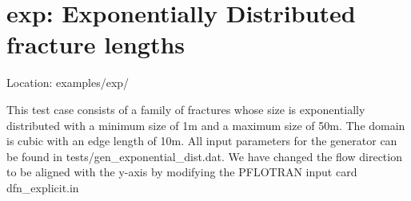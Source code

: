 \documentclass[letterpaper,10pt,english]{sphinxmanual}
\begin{document}
\begin{figure}[htbp]
\centering
\capstart

\noindent{}
\caption{}\label{\detokenize{examples:id4}}\end{figure}

\begin{figure}[htbp]
\centering
\capstart

\noindent{}
\caption{}\label{\detokenize{examples:id5}}\end{figure}

\begin{figure}[htbp]
\centering
\capstart

\noindent{}
\caption{}\label{\detokenize{examples:id6}}\end{figure}


\section{exp: Exponentially Distributed fracture lengths}
\label{\detokenize{examples:exp-exponentially-distributed-fracture-lengths}}
Location: examples/exp/

This test case consists of a family of fractures whose size is exponentially distributed with a minimum size of 1m and a maximum size of 50m. The domain is cubic with an edge length of 10m. All input parameters for the generator can be found in tests/gen\_exponential\_dist.dat.  We have changed the flow direction to be aligned with the y-axis by modifying the PFLOTRAN input card dfn\_explicit.in

\begin{figure}[htbp]
\centering
\capstart

\noindent{}
\caption{}\label{\detokenize{examples:id7}}\end{figure}

\begin{figure}[htbp]
\centering
\capstart

\noindent{}
\caption{}\label{\detokenize{examples:id8}}\end{figure}
\end{document}
